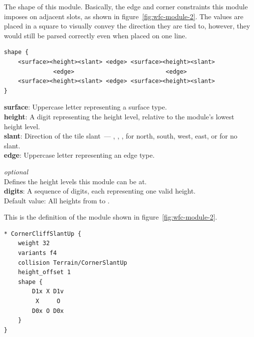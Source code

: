 The shape of this module.
Basically, the edge and corner constraints this module imposes on adjacent slots, as shown in figure~\ref{fig:wfc-module-2}.
The values are placed in a square to visually convey the direction they are tied to, however, they would still be parsed correctly even when placed on one line.
\begin{verbatim}
shape {
    <surface><height><slant> <edge> <surface><height><slant>
              <edge>                          <edge>
    <surface><height><slant> <edge> <surface><height><slant>
}
\end{verbatim}
\textbf{surface}: Uppercase letter representing a surface type.\\
\textbf{height}: A digit representing the height level, relative to the module's lowest height level.\\
\textbf{slant}: Direction of the tile slant~--- \mono{\^}, , \mono{<}, \mono{>} for north, south, west, east, or  for no slant.\\
\textbf{edge}: Uppercase letter representing an edge type.

\emph{optional}\\
Defines the height levels this module can be at.\\
\textbf{digits}: A sequence of digits, each representing one valid height.\\
Default value: All heights from  to .

This is the definition of the module shown in figure~\ref{fig:wfc-module-2}.
\begin{verbatim}
* CornerCliffSlantUp {
    weight 32
    variants f4
    collision Terrain/CornerSlantUp
    height_offset 1
    shape {
        D1x X D1v
         X     O
        D0x O D0x
    }
}
\end{verbatim}

